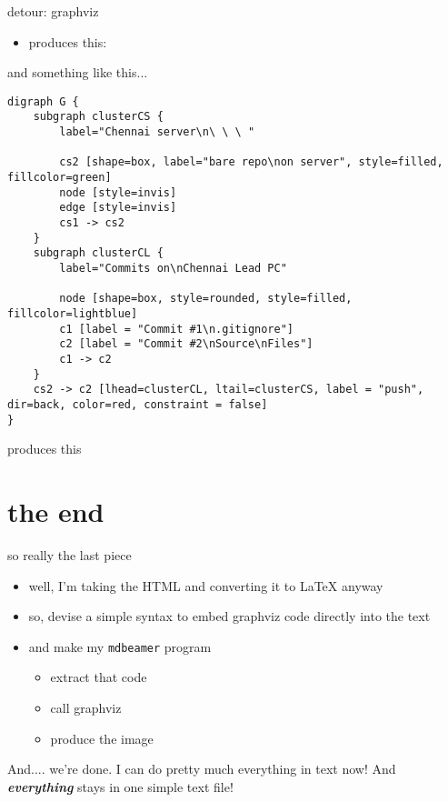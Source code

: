 \documentclass{beamer}
\begin{document}
\begin{frame}{detour: graphviz}

\begin{itemize}
\item
produces this:
\end{itemize}




\end{frame}

\begin{frame}[fragile]{and something like this...}

\tiny

\begin{verbatim}
digraph G {
    subgraph clusterCS {
        label="Chennai server\n\ \ \ "

        cs2 [shape=box, label="bare repo\non server", style=filled, fillcolor=green]
        node [style=invis]
        edge [style=invis]
        cs1 -> cs2
    }
    subgraph clusterCL {
        label="Commits on\nChennai Lead PC"

        node [shape=box, style=rounded, style=filled, fillcolor=lightblue]
        c1 [label = "Commit #1\n.gitignore"]
        c2 [label = "Commit #2\nSource\nFiles"]
        c1 -> c2
    }
    cs2 -> c2 [lhead=clusterCL, ltail=clusterCS, label = "push", dir=back, color=red, constraint = false]
}

\end{verbatim}




\end{frame}

\begin{frame}{produces this}




\end{frame}


\section{the end}

\begin{frame}{so really the last piece}

\begin{itemize}
\item
well, I'm taking the HTML and converting it to LaTeX anyway
\item
so, devise a simple syntax to embed graphviz code directly into the text
\item
and make my \texttt{mdbeamer} program
\begin{itemize}
\item
extract that code
\item
call graphviz
\item
produce the image
\end{itemize}
\end{itemize}

And.... we're done.  I can do pretty much everything in text now!  And
\textbf{\textit{everything}} stays in one simple text file!

\end{frame}
\end{document}
